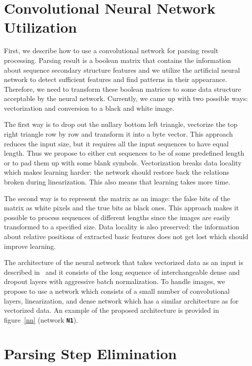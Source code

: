 \section{Convolutional Neural Network Utilization}

First, we describe how to use a convolutional network for parsing result processing. Parsing result is a boolean matrix that contains the information about sequence secondary structure features and we utilize the artificial neural network to detect sufficient features and find patterns in their appearance.
Therefore, we need to transform these boolean matrices to some data structure acceptable by the neural network.
Currently, we came up with two possible ways: vectorization and conversion to a black and white image.

The first way is to drop out the nullary bottom left triangle, vectorize the top right triangle row by row and transform it into a byte vector.
This approach reduces the input size, but it requires all the input sequences to have equal length.
Thus we propose to either cut sequences to be of some predefined length or to pad them up with some blank symbols.
Vectorization breaks data locality which makes learning harder: the network should restore back the relations broken during linearization.
This also means that learning takes more time.

The second way is to represent the matrix as an image: the false bits of the matrix as white pixels and the true bits as black ones.
This approach makes it possible to process sequences of different lengths since the images are easily transformed to a specified size.
Data locality is also preserved: the information about relative positions of extracted basic features does not get lost which should improve learning.

The architecture of the neural network that takes vectorized data as an input is described in~\cite{grigorevcomposition} and it consists of the long sequence of interchangeable dense and dropout layers with aggressive batch normalization. 
To handle images, we propose to use a network which consists of a small number of convolutional layers, linearization, and dense network which has a similar architecture as for vectorized data.
An example of the proposed architecture is provided in figure~\ref{nn} (network \textbf{\texttt{N1}}).

\section{Parsing Step Elimination}

